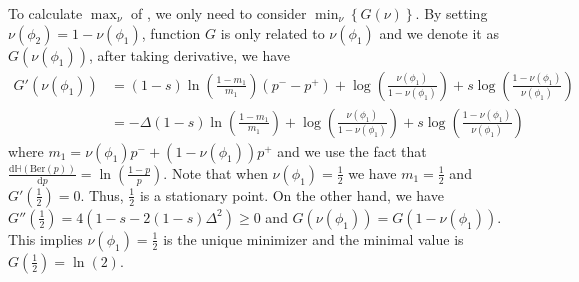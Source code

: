 To calculate $\max_{\nu}$ of , we only need to consider $ \min_{\nu}\left\{G(\nu)\right\}$. By setting $\nu(\phi_2) = 1 - \nu(\phi_1)$,  function $G$ is only related to $\nu(\phi_1)$ and we denote it as $G(\nu(\phi_1))$, after taking derivative, we have
\begin{align*}
    G'(\nu(\phi_1))&=(1-s)\ln\left(\frac{1-m_1}{m_1}\right)\left(p^{-} - p^+\right) + \log\left(\frac{\nu(\phi_1)}{1-\nu(\phi_1)}\right) + s\log\left(\frac{1-\nu(\phi_1)}{\nu(\phi_1)}\right)
    \\&= -\Delta(1-s)\ln\left(\frac{1-m_1}{m_1}\right) + \log\left(\frac{\nu(\phi_1)}{1-\nu(\phi_1)}\right) + s\log\left(\frac{1-\nu(\phi_1)}{\nu(\phi_1)}\right)
\end{align*}
where $m_1 = \nu(\phi_1)p^{-} +  (1- \nu(\phi_1))p^{+}$ and we use the fact that $\frac{\mathrm{d}\mathbb{H}(\text{Ber}(p))}{\mathrm{d}p} = \ln\left(\frac{1-p}{p}\right)$. Note that when $\nu(\phi_1) = \frac{1}{2}$ we have $m_1 = \frac{1}{2}$ and $G'(\frac{1}{2}) = 0$. Thus, $\frac{1}{2}$ is a stationary point. On the other hand, we have $G''(\frac{1}{2}) = 4(1-s - 2(1-s)\Delta^2) \geq 0$ and $G(\nu(\phi_1)) = G(1- \nu(\phi_1))$. This implies $\nu(\phi_1) = \frac{1}{2}$ is the unique minimizer and the minimal value is $G(\frac{1}{2}) = \ln(2)$.

